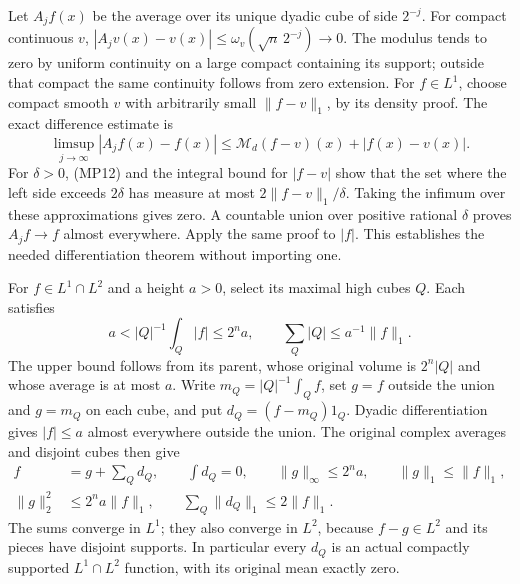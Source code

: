 \documentclass[
  11pt,
]{article}
\makeatletter
\let\ReaderOriginalAnchorStart\hyper@anchorstart
\let\ReaderOriginalAnchorEnd\hyper@anchorend
\let\ReaderPendingAliases\@empty
\def\ReaderArmAliases#1{\gdef\ReaderPendingAliases{#1}}
\def\hyper@anchorstart#1{\ReaderIfNativeAnchorTF{#1}{\ReaderPendingAliases\global\let\ReaderPendingAliases\@empty}{}\ReaderOriginalAnchorStart{#1}}
\makeatother
\begin{document}
Let \(A_jf(x)\) be the average over its unique dyadic cube of side
\(2^{-j}\). For compact continuous \(v\),
\(|A_jv(x)-v(x)|\leq\omega_v(\sqrt n\,2^{-j})\to0\). The modulus tends
to zero by uniform continuity on a large compact containing its support;
outside that compact the same continuity follows from zero extension.
For \(f\in L^1\), choose compact smooth \(v\) with arbitrarily small
\(\|f-v\|_1\), by its density proof. The exact difference estimate is \[
 \limsup_{j\to\infty}|A_jf(x)-f(x)|
       \leq\mathcal M_d(f-v)(x)+|f(x)-v(x)|.
                                                               \tag{MP13}
\] For \(\delta>0\), (MP12) and the integral bound for \(|f-v|\) show
that the set where the left side exceeds \(2\delta\) has measure at most
\(2\|f-v\|_1/\delta\). Taking the infimum over these approximations
gives zero. A countable union over positive rational \(\delta\) proves
\(A_jf\to f\) almost everywhere. Apply the same proof to \(|f|\). This
establishes the needed differentiation theorem without importing one.

For \(f\in L^1\cap L^2\) and a height \(a>0\), select its maximal high
cubes \(Q\). Each satisfies \[
 a<|Q|^{-1}\int_Q|f|\leq2^na,
 \qquad \sum_Q|Q|\leq a^{-1}\|f\|_1 .
                                                               \tag{MP14}
\] The upper bound follows from its parent, whose original volume is
\(2^n|Q|\) and whose average is at most \(a\). Write
\(m_Q=|Q|^{-1}\int_Qf\), set \(g=f\) outside the union and \(g=m_Q\) on
each cube, and put \(d_Q=(f-m_Q)1_Q\). Dyadic differentiation gives
\(|f|\leq a\) almost everywhere outside the union. The original complex
averages and disjoint cubes then give \[
 \begin{split}
 f&=g+\sum_Qd_Q,\qquad \int d_Q=0,\qquad
 \|g\|_\infty\leq2^na,\qquad \|g\|_1\leq\|f\|_1,\\
 \|g\|_2^2&\leq2^na\|f\|_1,\qquad
 \sum_Q\|d_Q\|_1\leq2\|f\|_1 .
 \end{split}                                                   \tag{MP15}
\] The sums converge in \(L^1\); they also converge in \(L^2\), because
\(f-g\in L^2\) and its pieces have disjoint supports. In particular
every \(d_Q\) is an actual compactly supported \(L^1\cap L^2\) function,
with its original mean exactly zero.

\ReaderArmAliases{\ReaderOriginalAnchorStart{AN03-LCE-MULT-005}\ReaderOriginalAnchorEnd\begingroup\expandafter\def\csname @currentHref\endcsname{AN03-LCE-MULT-005}\label{AN03-LCE-MULT-005}\endgroup\ReaderOriginalAnchorStart{complete-weak-estimate-with-the-actual-symbol-bound}\ReaderOriginalAnchorEnd}
\end{document}
